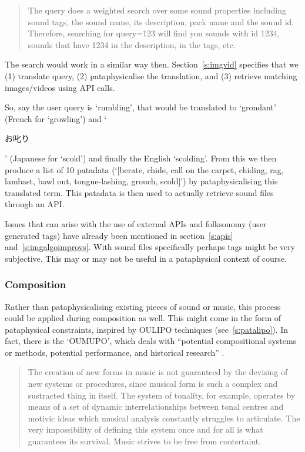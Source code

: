 \documentclass[11pt]{thesis} %
\begin{document}
\begin{quotation}
  The query does a weighted search over some sound properties including sound tags, the sound name, its description, pack name and the sound id. Therefore, searching for query=123 will find you sounds with id 1234, sounds that have 1234 in the description, in the tags, etc. 
\end{quotation}

The search would work in a similar way then. Section~\ref{s:imgvid} specifies that we (1) translate query, (2) pataphysicalise the translation, and (3) retrieve matching images/videos using \ac{API} calls.

So, say the user query is `rumbling', that would be translated to `grondant' (French for `growling') and `\begin{CJK}{UTF8}{min}お叱り\end{CJK}' (Japanese for `scold') and finally the English `scolding'. From this we then produce a list of 10 patadata (`[berate, chide, call on the carpet, chiding, rag, lambast, bawl out, tongue-lashing, grouch, scold]') by pataphysicalising this translated term. This patadata is then used to actually retrieve sound files through an \ac{API}.

Issues that can arise with the use of external \ac{API}s and folksonomy (user generated tags) have already been mentioned in section~\ref{s:apis} and~\ref{s:imgalgoimprovs}. With sound files specifically perhaps tags might be very subjective. This may or may not be useful in a pataphysical context of course.


\subsubsection{Composition}
\label{s:composition}

Rather than pataphysicalising existing pieces of sound or music, this process could be applied during composition as well. This might come in the form of pataphysical constraints, inspired by \ac{OULIPO} techniques (see~\ref{s:patalipo}). In fact, there is the `OUMUPO', which deals with ``potential compositional systems or methods, potential performance, and historical research'' \autocite{Mathews2005}.

\begin{quotation}
  The creation of new forms in music is not guaranteed by the devising of new systems or procedures, since musical form is such a complex and sustracted thing in itself. The system of tonality, for example, operates by means of a set of dynamic interrelationships between tonal centres and motivic ideas which musical analysis constantly struggles to articulate. The very impossibility of defining this system once and for all is what guarantees its survival. Music strives to be free from contsrtaint. 
\end{quotation}
\end{document}
